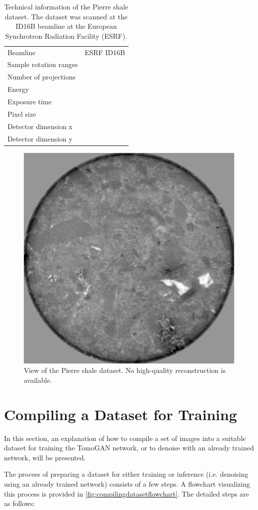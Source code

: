 \begin{table}[htbp]
    \centering
    \caption[Technical information of the Pierre shale dataset]{Technical information of the Pierre shale dataset. The dataset was scanned at the ID16B beamline at the European Synchrotron Radiation Facility (ESRF). }
    \label{tab:pierreshale}
    \begin{tabular}{ll}
    \hline
    Beamline & ESRF ID16B \\
    Sample rotation ranges &  \\
    Number of projections &  \\
    Energy & \\
    Exposure time & \\
    Pixel size & \\
    Detector dimension x &  \\
    Detector dimension y &  \\
    \hline
    \end{tabular}
\end{table}

\begin{figure}[htbp]
    \centering
    \includegraphics[width=.45\textwidth]{figures/shale/shale_ns/0.png}
    \caption[Pierre shale dataset]{View of the Pierre shale dataset. No high-quality reconstruction is available. }
    \label{fig:shaledataset}
  \end{figure}


\section{Compiling a Dataset for Training}
\label{sec:method:compilingdataset}
In this section, an explanation of how to compile a set of images into a suitable dataset for training the TomoGAN network, or to denoise with an already trained network, will be presented. 

The process of preparing a dataset for either training or inference (i.e. denoising using an already trained network) consists of a few steps. A flowchart visualizing this process is provided in \cref{fig:compilingdatasetflowchart}. The detailed steps are as follows:


